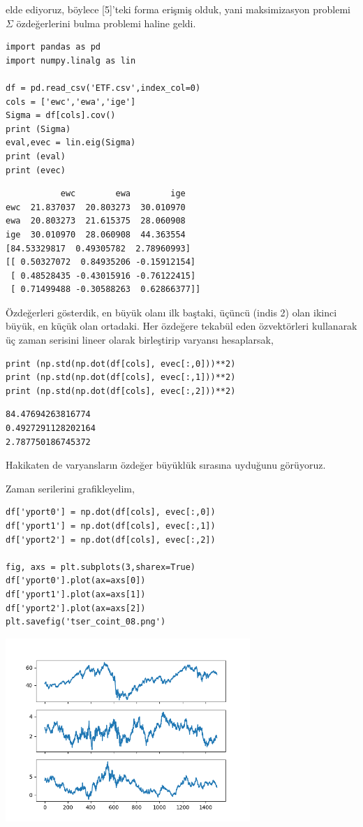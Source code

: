 \documentclass[12pt,fleqn]{article}\usepackage{../../common}
\begin{document}
elde ediyoruz, böylece [5]'teki forma erişmiş olduk, yani maksimizasyon
problemi $\Sigma$ özdeğerlerini bulma problemi haline geldi.

\begin{verbatim}
import pandas as pd
import numpy.linalg as lin

df = pd.read_csv('ETF.csv',index_col=0)
cols = ['ewc','ewa','ige']
Sigma = df[cols].cov()
print (Sigma)
eval,evec = lin.eig(Sigma)
print (eval)
print (evec)
\end{verbatim}

\begin{verbatim}
           ewc        ewa        ige
ewc  21.837037  20.803273  30.010970
ewa  20.803273  21.615375  28.060908
ige  30.010970  28.060908  44.363554
[84.53329817  0.49305782  2.78960993]
[[ 0.50327072  0.84935206 -0.15912154]
 [ 0.48528435 -0.43015916 -0.76122415]
 [ 0.71499488 -0.30588263  0.62866377]]
\end{verbatim}

Özdeğerleri gösterdik, en büyük olanı ilk baştaki, üçüncü (indis 2) olan ikinci
büyük, en küçük olan ortadaki. Her özdeğere tekabül eden özvektörleri kullanarak
üç zaman serisini lineer olarak birleştirip varyansı hesaplarsak,

\begin{verbatim}
print (np.std(np.dot(df[cols], evec[:,0]))**2)
print (np.std(np.dot(df[cols], evec[:,1]))**2)
print (np.std(np.dot(df[cols], evec[:,2]))**2)
\end{verbatim}

\begin{verbatim}
84.47694263816774
0.4927291128202164
2.787750186745372
\end{verbatim}

Hakikaten de varyansların özdeğer büyüklük sırasına uyduğunu görüyoruz.

Zaman serilerini grafikleyelim,

\begin{verbatim}
df['yport0'] = np.dot(df[cols], evec[:,0])
df['yport1'] = np.dot(df[cols], evec[:,1])
df['yport2'] = np.dot(df[cols], evec[:,2])

fig, axs = plt.subplots(3,sharex=True)
df['yport0'].plot(ax=axs[0])
df['yport1'].plot(ax=axs[1])
df['yport2'].plot(ax=axs[2])
plt.savefig('tser_coint_08.png')
\end{verbatim}

\includegraphics[width=25em]{tser_coint_08.png}
\end{document}
